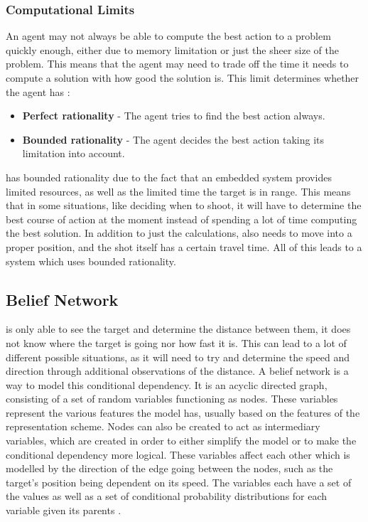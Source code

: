 \subsubsection{Computational Limits}
An agent may not always be able to compute the best action to a problem quickly
enough, either due to memory limitation or just the sheer size of the problem.
This means that the agent may need to trade off the time it needs to compute a
solution with how good the solution is. This limit determines whether the agent
has \citep[ch.1.5.8]{MIBook}:

\begin{itemize}
  \item \textbf{Perfect rationality} - The agent tries to find the best action
  always.
  \item \textbf{Bounded rationality} - The agent decides the best action taking
  its limitation into account.
\end{itemize}

\name has bounded rationality due to the fact that an embedded system provides
limited resources, as well as the limited time the target is in range. This means that
in some situations, like deciding when to shoot, it will have to determine the
best course of action at the moment instead of spending a lot of time computing
the best solution. In addition to just the calculations, \name also needs to
move into a proper position, and the shot itself has a certain travel time. All
of this leads to a system which uses bounded rationality.

\subsection{Belief Network}\label{LabelBN}
\name is only able to see the
target and determine the distance between them, it does not know where the
target is going nor how fast it is. This can lead to a lot of different possible
situations, as it will need to try and determine the speed and direction through
additional observations of the distance. A belief network is a way to model
this conditional dependency. It is an acyclic directed graph, consisting of a
set of random variables functioning as nodes. These variables represent the
various features the model has, usually based on the features of
the representation scheme. Nodes can also be created to act as
intermediary variables, which are created in order to either simplify the model
or to make the conditional dependency more logical. These variables affect each
other which is modelled by the direction of the edge going between the nodes,
such as the target's position being dependent on its speed. The variables each
have a set of the values as well as a set of conditional probability
distributions for each variable given its parents \citep[ch.6.3]{MIBook}.\nl

